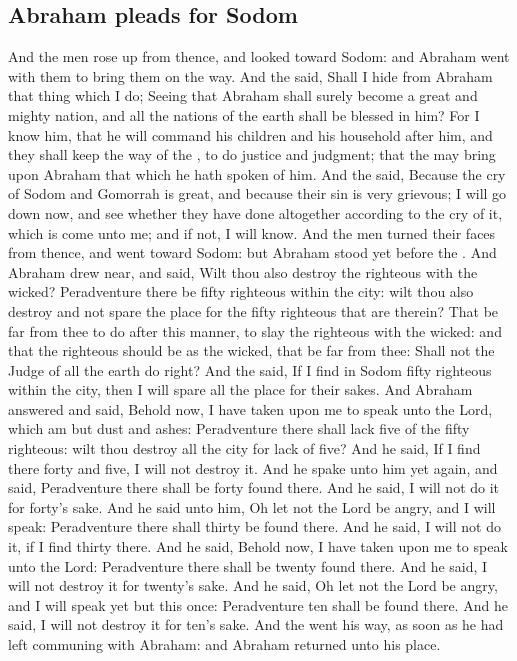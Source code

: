 \begin{biblechapter}
\section*{Abraham pleads for Sodom}
\verse And the men rose up from thence, and looked toward Sodom: and Abraham went with them to bring them on the way.
\verse And the \LORD said, Shall I hide from Abraham that thing which I do;
\verse Seeing that Abraham shall surely become a great and mighty nation, and all the nations of the earth shall be blessed in him?
\verse For I know him, that he will command his children and his household after him, and they shall keep the way of the \LORD, to do justice and judgment; that the \LORD may bring upon Abraham that which he hath spoken of him.
\verse And the \LORD said, Because the cry of Sodom and Gomorrah is great, and because their sin is very grievous;
\verse I will go down now, and see whether they have done altogether according to the cry of it, which is come unto me; and if not, I will know.
\verse And the men turned their faces from thence, and went toward Sodom: but Abraham stood yet before the \LORD.
\verse And Abraham drew near, and said, Wilt thou also destroy the righteous with the wicked?
\verse Peradventure there be fifty righteous within the city: wilt thou also destroy and not spare the place for the fifty righteous that are therein?
\verse That be far from thee to do after this manner, to slay the righteous with the wicked: and that the righteous should be as the wicked, that be far from thee: Shall not the Judge of all the earth do right?
\verse And the \LORD said, If I find in Sodom fifty righteous within the city, then I will spare all the place for their sakes.
\verse And Abraham answered and said, Behold now, I have taken upon me to speak unto the Lord, which am but dust and ashes:
\verse Peradventure there shall lack five of the fifty righteous: wilt thou destroy all the city for lack of five? And he said, If I find there forty and five, I will not destroy it.
\verse And he spake unto him yet again, and said, Peradventure there shall be forty found there. And he said, I will not do it for forty's sake.
\verse And he said unto him, Oh let not the Lord be angry, and I will speak: Peradventure there shall thirty be found there. And he said, I will not do it, if I find thirty there.
\verse And he said, Behold now, I have taken upon me to speak unto the Lord: Peradventure there shall be twenty found there. And he said, I will not destroy it for twenty's sake.
\verse And he said, Oh let not the Lord be angry, and I will speak yet but this once: Peradventure ten shall be found there. And he said, I will not destroy it for ten's sake.
\verse And the \LORD went his way, as soon as he had left communing with Abraham: and Abraham returned unto his place.
\end{biblechapter}

